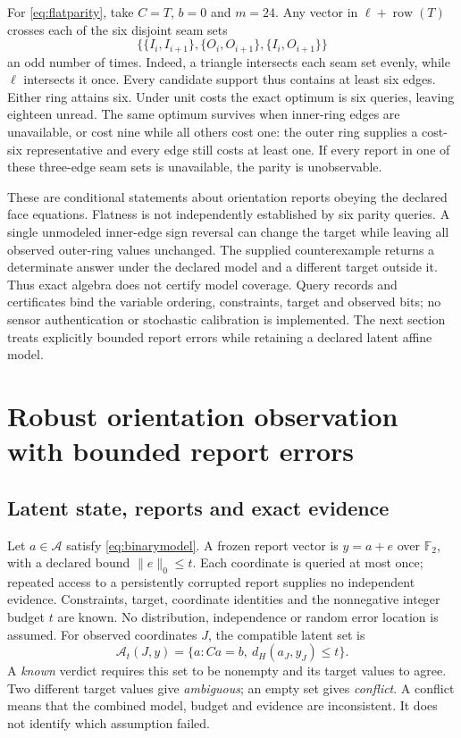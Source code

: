 \documentclass[11pt,a4paper]{article}
\theoremstyle{definition}\newtheorem{definition}[theorem]{Definition}
\begin{document}
For \eqref{eq:flatparity}, take $C=T$, $b=0$ and $m=24$. Any vector in $\ell+\operatorname{row}(T)$ crosses each of the six disjoint seam sets
\[
 \{\{I_i,I_{i+1}\},\{O_i,O_{i+1}\},\{I_i,O_{i+1}\}\}
\]
an odd number of times. Indeed, a triangle intersects each seam set evenly, while $\ell$ intersects it once. Every candidate support thus contains at least six edges. Either ring attains six. Under unit costs the exact optimum is six queries, leaving eighteen unread. The same optimum survives when inner-ring edges are unavailable, or cost nine while all others cost one: the outer ring supplies a cost-six representative and every edge still costs at least one. If every report in one of these three-edge seam sets is unavailable, the parity is unobservable.

These are conditional statements about orientation reports obeying the declared face equations. Flatness is not independently established by six parity queries. A single unmodeled inner-edge sign reversal can change the target while leaving all observed outer-ring values unchanged. The supplied counterexample returns a determinate answer under the declared model and a different target outside it. Thus exact algebra does not certify model coverage. Query records and certificates bind the variable ordering, constraints, target and observed bits; no sensor authentication or stochastic calibration is implemented. The next section treats explicitly bounded report errors while retaining a declared latent affine model.

\section{Robust orientation observation with bounded report errors}\label{sec:robustorientation}
\subsection{Latent state, reports and exact evidence}
Let $a\in\mathcal A$ satisfy \eqref{eq:binarymodel}. A frozen report vector is $y=a+e$ over $\mathbb F_2$, with a declared bound $\lVert e\rVert_0\leq t$. Each coordinate is queried at most once; repeated access to a persistently corrupted report supplies no independent evidence. Constraints, target, coordinate identities and the nonnegative integer budget $t$ are known. No distribution, independence or random error location is assumed. For observed coordinates $J$, the compatible latent set is
\begin{equation}
 \mathcal A_t(J,y)=\{a:Ca=b,\ d_H(a_J,y_J)\leq t\}.
 \label{eq:robustset}
\end{equation}
A \emph{known} verdict requires this set to be nonempty and its target values to agree. Two different target values give \emph{ambiguous}; an empty set gives \emph{conflict}. A conflict means that the combined model, budget and evidence are inconsistent. It does not identify which assumption failed.
\end{document}
